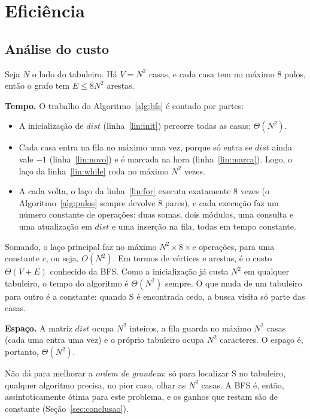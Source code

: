 \section{Eficiência}
\label{sec:eficiencia}

\subsection{Análise do custo}
\label{sec:custo}

Seja $N$ o lado do tabuleiro. Há $V = N^2$ casas, e cada casa tem no máximo 8 pulos, então o
grafo tem $E \le 8N^2$ arestas.

\textbf{Tempo.} O trabalho do Algoritmo~\ref{alg:bfs} é contado por partes:

\begin{itemize}
  \item A inicialização de $dist$ (linha~\ref{lin:init}) percorre todas as casas:
    $\Theta(N^2)$.
  \item Cada casa entra na fila no máximo uma vez, porque só entra se $dist$ ainda vale $-1$
    (linha~\ref{lin:novo}) e é marcada na hora (linha~\ref{lin:marca}). Logo, o laço da
    linha~\ref{lin:while} roda no máximo $N^2$ vezes.
  \item A cada volta, o laço da linha~\ref{lin:for} executa exatamente 8 vezes (o
    Algoritmo~\ref{alg:pulos} sempre devolve 8 pares), e cada execução faz um número constante
    de operações: duas somas, dois módulos, uma consulta e uma atualização em $dist$ e uma
    inserção na fila, todas em tempo constante.
\end{itemize}

Somando, o laço principal faz no máximo $N^2 \times 8 \times c$ operações, para uma constante
$c$, ou seja, $O(N^2)$. Em termos de vértices e arestas, é o custo $\Theta(V + E)$ conhecido da
BFS. Como a inicialização já custa $N^2$ em qualquer tabuleiro, o tempo do
algoritmo é $\Theta(N^2)$ sempre. O que muda de um tabuleiro para outro é a constante: quando S
é encontrada cedo, a busca visita só parte das casas.

\textbf{Espaço.} A matriz $dist$ ocupa $N^2$ inteiros, a fila guarda no máximo $N^2$ casas
(cada uma entra uma vez) e o próprio tabuleiro ocupa $N^2$ caracteres. O espaço é, portanto,
$\Theta(N^2)$.

Não dá para melhorar a \emph{ordem de grandeza}: só para localizar S no tabuleiro, qualquer
algoritmo precisa, no pior caso, olhar as $N^2$ casas. A BFS é, então, assintoticamente ótima
para este problema, e os ganhos que restam são de constante (Seção~\ref{sec:conclusao}).

